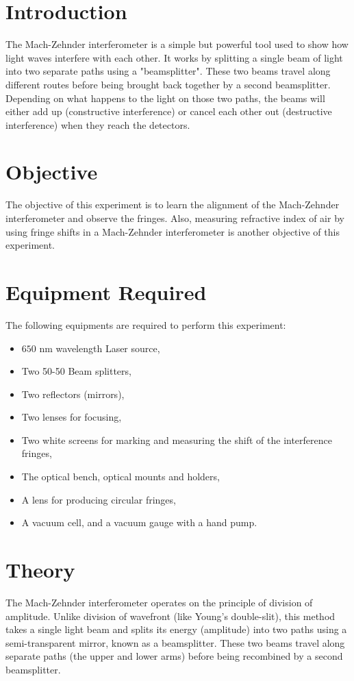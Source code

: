 
\renewcommand{\arraystretch}{1.5} %
\section{Introduction}
The Mach-Zehnder interferometer is a simple but powerful tool used to show how light waves interfere with each other. It works by splitting a single beam of light into two separate paths using a "beamsplitter". These two beams travel along different routes before being brought back together by a second beamsplitter. Depending on what happens to the light on those two paths, the beams will either add up (constructive interference) or cancel each other out (destructive interference) when they reach the detectors.
\section{Objective}
The objective of this experiment is to learn the alignment of the Mach-Zehnder interferometer and observe the fringes. Also, measuring refractive index of air by using fringe shifts in a Mach-Zehnder interferometer is another objective of this experiment.
\section{Equipment Required}
The following equipments are required to perform this experiment:
\begin{itemize}
    \item $650 \text{ nm}$ wavelength Laser source,
    \item Two 50-50 Beam splitters,
    \item Two reflectors (mirrors),
    \item Two lenses for focusing,
    \item Two white screens for marking and measuring the shift of the interference fringes,
    \item The optical bench, optical mounts and holders,
    \item A lens for producing circular fringes,
    \item A vacuum cell, and a vacuum gauge with a hand pump.
\end{itemize}
\section{Theory}
The Mach-Zehnder interferometer operates on the principle of division of amplitude. Unlike division of wavefront (like Young's double-slit), this method takes a single light beam and splits its energy (amplitude) into two paths using a semi-transparent mirror, known as a beamsplitter. These two beams travel along separate paths (the upper and lower arms) before being recombined by a second beamsplitter.

